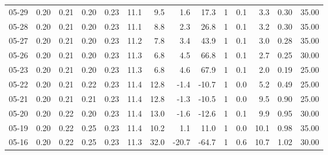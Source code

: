 \begin{threeparttable}
{\begin{tabular}{lrrrrrrrrrrrrr}
  05-29 &          0.20 &          0.21 &          0.20 &        0.23 &                11.1 &                 9.5 &        1.6 &         17.3 &              1 &                 0.1 &              3.3 &            0.30 &                  35.00 \\
  05-28 &          0.20 &          0.21 &          0.20 &        0.23 &                11.1 &                 8.8 &        2.3 &         26.8 &              1 &                 0.1 &              3.2 &            0.30 &                  35.00 \\
  05-27 &          0.20 &          0.21 &          0.20 &        0.23 &                11.2 &                 7.8 &        3.4 &         43.9 &              1 &                 0.1 &              3.0 &            0.28 &                  35.00 \\
  05-26 &          0.20 &          0.21 &          0.20 &        0.23 &                11.3 &                 6.8 &        4.5 &         66.8 &              1 &                 0.1 &              2.7 &            0.25 &                  30.00 \\
  05-23 &          0.20 &          0.21 &          0.20 &        0.23 &                11.3 &                 6.8 &        4.6 &         67.9 &              1 &                 0.1 &              2.0 &            0.19 &                  25.00 \\
  05-22 &          0.20 &          0.21 &          0.22 &        0.23 &                11.4 &                12.8 &       -1.4 &        -10.7 &              1 &                 0.0 &              5.2 &            0.49 &                  25.00 \\
  05-21 &          0.20 &          0.21 &          0.21 &        0.23 &                11.4 &                12.8 &       -1.3 &        -10.5 &              1 &                 0.0 &              9.5 &            0.90 &                  25.00 \\
  05-20 &          0.20 &          0.22 &          0.20 &        0.23 &                11.4 &                13.0 &       -1.6 &        -12.6 &              1 &                 0.1 &              9.9 &            0.95 &                  30.00 \\
  05-19 &          0.20 &          0.22 &          0.25 &        0.23 &                11.4 &                10.2 &        1.1 &         11.0 &              1 &                 0.0 &             10.1 &            0.98 &                  35.00 \\
  05-16 &          0.20 &          0.22 &          0.25 &        0.23 &                11.3 &                32.0 &      -20.7 &        -64.7 &              1 &                 0.6 &             10.7 &            1.02 &                  30.00 \\

\end{tabular}}
\end{threeparttable}
